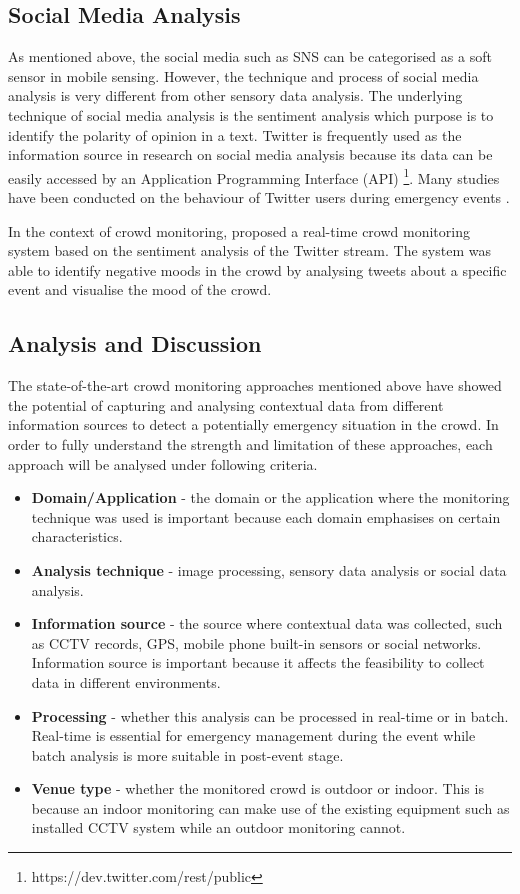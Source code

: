 \subsection{Social Media Analysis}
As mentioned above, the social media such as SNS can be categorised as a soft sensor in mobile sensing. However, the technique and process of social media analysis is very different from other sensory data analysis. The underlying technique of social media analysis is the sentiment analysis which purpose is to identify the polarity of opinion in a text. Twitter is frequently used as the information source in research on social media analysis because its data can be easily accessed by an Application Programming Interface (API) \footnote{https://dev.twitter.com/rest/public}. Many studies have been conducted on the behaviour of Twitter users during emergency events \citep{Hughes2009,Sakaki2010,Vieweg2010,Yin2012}.

In the context of crowd monitoring, \citet{DelirHaghighi2013} proposed a real-time crowd monitoring system based on the sentiment analysis of the Twitter stream. The system was able to identify negative moods in the crowd by analysing tweets about a specific event and visualise the mood of the crowd.

\subsection{Analysis and Discussion}
The state-of-the-art crowd monitoring approaches mentioned above have showed the potential of capturing and analysing contextual data from different information sources to detect a potentially emergency situation in the crowd. In order to fully understand the strength and limitation of these approaches, each approach will be analysed under following criteria.

\begin{itemize}
	\item \textbf{Domain/Application} - the domain or the application where the monitoring technique was used is important because each domain emphasises on certain characteristics. 
	\item \textbf{Analysis technique} - image processing, sensory data analysis or social data analysis.
	\item \textbf{Information source} - the source where contextual data was collected, such as CCTV records, GPS, mobile phone built-in sensors or social networks. Information source is important because it affects the feasibility to collect data in different environments.
	\item \textbf{Processing} - whether this analysis can be processed in real-time or in batch. Real-time is essential for emergency management during the event while batch analysis is more suitable in post-event stage.
	\item \textbf{Venue type} - whether the monitored crowd is outdoor or indoor. This is because an indoor monitoring can make use of the existing equipment such as installed CCTV system while an outdoor monitoring cannot.
\end{itemize}

